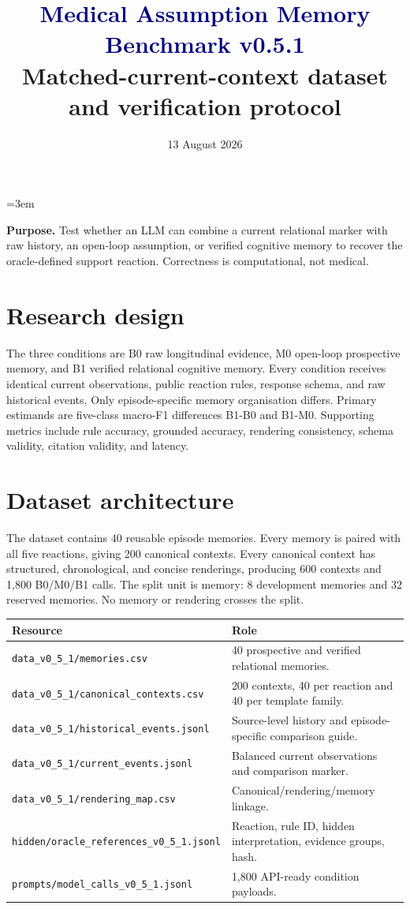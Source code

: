 \documentclass[10.5pt]{article}\usepackage[margin=.82in]{geometry}\usepackage[T1]{fontenc}\usepackage{lmodern,microtype,booktabs,longtable,amsmath,xcolor,hyperref,fancyhdr}
\title{\vspace{-1cm}\textcolor{navy}{\Huge Medical Assumption Memory Benchmark v0.5.1}\\\Large Matched-current-context dataset and verification protocol}\date{13 August 2026}
\begin{document}
\sloppy\emergencystretch=3em\maketitle
\noindent\colorbox{pale}{\parbox{.96\linewidth}{\textbf{Purpose.} Test whether an LLM can combine a current relational marker with raw history, an open-loop assumption, or verified cognitive memory to recover the oracle-defined support reaction. Correctness is computational, not medical.}}
\tableofcontents\newpage
\section{Research design}The three conditions are B0 raw longitudinal evidence, M0 open-loop prospective memory, and B1 verified relational cognitive memory. Every condition receives identical current observations, public reaction rules, response schema, and raw historical events. Only episode-specific memory organisation differs. Primary estimands are five-class macro-F1 differences B1-B0 and B1-M0. Supporting metrics include rule accuracy, grounded accuracy, rendering consistency, schema validity, citation validity, and latency.
\section{Dataset architecture}The dataset contains 40 reusable episode memories. Every memory is paired with all five reactions, giving 200 canonical contexts. Every canonical context has structured, chronological, and concise renderings, producing 600 contexts and 1,800 B0/M0/B1 calls. The split unit is memory: 8 development memories and 32 reserved memories. No memory or rendering crosses the split.
\begin{longtable}{p{}p{}}\toprule\textbf{Resource}&\textbf{Role}\\\midrule
\texttt{data\_v0\_5\_1/memories.csv}&40 prospective and verified relational memories.\\
\texttt{data\_v0\_5\_1/canonical\_contexts.csv}&200 contexts, 40 per reaction and 40 per template family.\\
\texttt{data\_v0\_5\_1/historical\_events.jsonl}&Source-level history and episode-specific comparison guide.\\
\texttt{data\_v0\_5\_1/current\_events.jsonl}&Balanced current observations and comparison marker.\\
\texttt{data\_v0\_5\_1/rendering\_map.csv}&Canonical/rendering/memory linkage.\\
\texttt{hidden/oracle\_references\_v0\_5\_1.jsonl}&Reaction, rule ID, hidden interpretation, evidence groups, hash.\\
\texttt{prompts/model\_calls\_v0\_5\_1.jsonl}&1,800 API-ready condition payloads.\\
\bottomrule\end{longtable}
\end{document}
